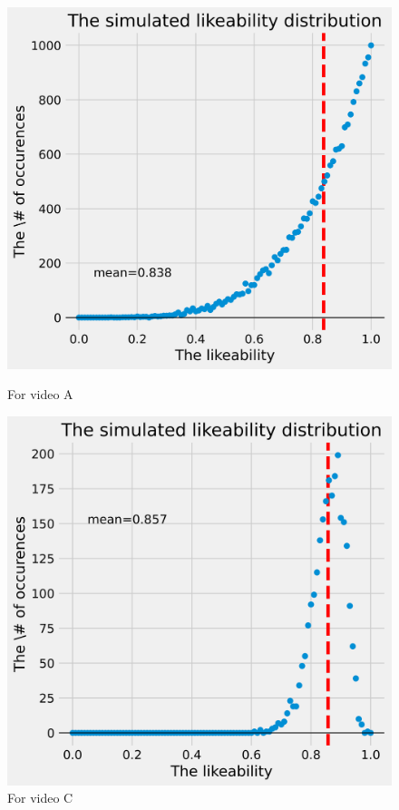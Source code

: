 \documentclass[a4paper,11pt]{article}
\begin{document}
\begin{figure}[H]
    \centering
    \begin{minipage}{.5\textwidth}
        \centering
        \includegraphics[width=0.9\linewidth]{assets/sim_ratings_v1.png}
        \caption{For video A}
        \label{fig:sim_ratings_v1}
    \end{minipage}%
    \begin{minipage}{.5\textwidth}
        \centering
        \includegraphics[width=0.9\linewidth]{assets/sim_ratings_v2.png}
        \caption{For video C}
        \label{fig:sim_ratings_v2}
    \end{minipage}
\end{figure}
\end{document}
